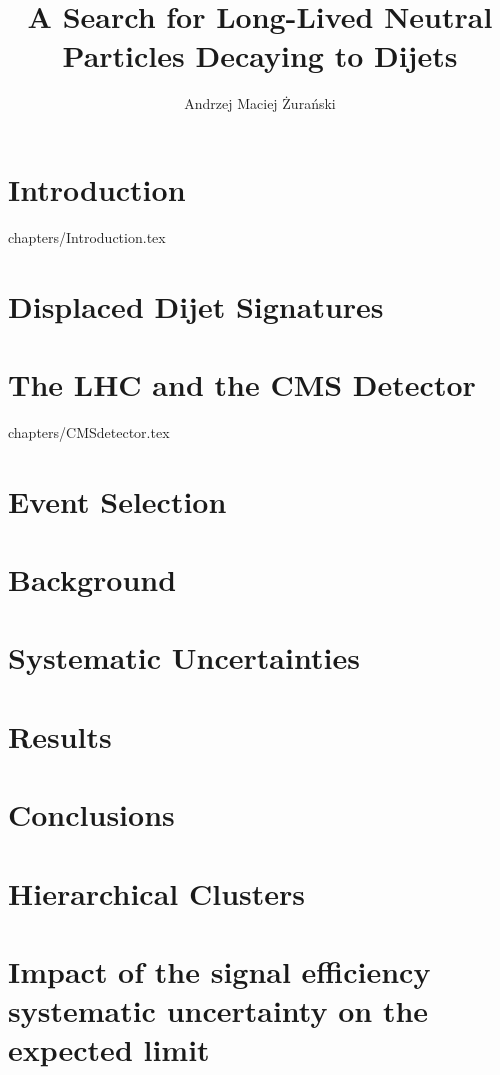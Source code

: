 \documentclass[phd,black]{PrincetonThesis}
\title{A Search for Long-Lived Neutral Particles Decaying to Dijets}
\author{Andrzej Maciej \.Zura\'nski}
\begin{document}
\begin{frontmatter}
  \begin{thesisabstract}
    
  \end{thesisabstract}
  \begin{acknowledgements}
    
  \end{acknowledgements}
\end{frontmatter}


\chapter{Introduction}
\label{chap:intro}
 {chapters/Introduction.tex}
\chapter{Displaced Dijet Signatures}

\chapter{The LHC and the CMS Detector}
\label{chap:cmslhc}
 {chapters/CMSdetector.tex}

\chapter{Event Selection}
\label{chap:selection}
 
 

\chapter{Background}


\chapter{Systematic Uncertainties}


\chapter{Results}


\chapter{Conclusions}
%


\appendix
\chapter{Hierarchical Clusters}

\chapter{Impact of the signal efficiency systematic uncertainty on the expected limit}

\cleardoublepage 
\end{document}
